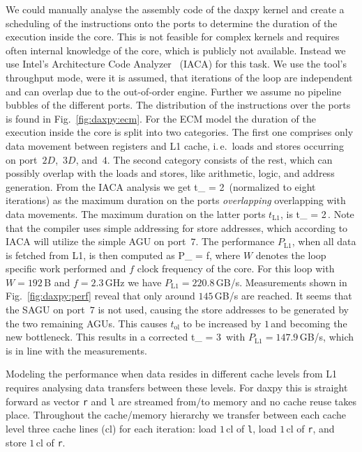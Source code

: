 {We could manually analyse the assembly code of the daxpy kernel and create a
scheduling of the instructions onto the ports to determine the duration of the
execution inside the core.
This is not feasible for complex kernels and requires often internal knowledge
of the core, which is publicly not available.
Instead we use Intel's Architecture Code Analyzer~\cite{intel-iaca} (IACA)
for this task. 
We use the tool's throughput mode, were it is assumed, that iterations of the
loop are independent and can overlap due to the out-of-order engine.
Further we assume no pipeline bubbles of the different ports. 
The distribution of the instructions over the ports is found in
Fig.~\ref{fig:daxpy:ecm}.
For the ECM model the duration of the execution inside the core is split into
two categories.
The first one comprises only data movement between registers and L1 cache,
i.\,e.\ loads and stores occurring on port~$2D$,~$3D$, and~$4$.
The second category consists of the rest, which can possibly overlap with the
loads and stores, like arithmetic, logic, and address generation.
%
From the IACA analysis we get 
\be
  t_ = 2\,\cyw
\ee
%
(normalized to eight iterations) as the maximum duration on the ports \textit{overlapping} overlapping with data
movements.
The maximum duration on the latter ports $t_\text{L1}$, is
\be
  t_ = 2\,\cyw.
\ee
%
Note that the compiler uses simple addressing for store addresses, which
according to IACA will utilize the simple AGU on port~$7$.
%
%
The performance $P_\text{L1}$, when all data is fetched from L1, is then
computed as 
%
\be
  P_ =  f,
\ee
%
where $W$ denotes the loop specific work performed and $f$ clock
frequency of the core.
For this loop with $W=192$\,B and $f=2.3$\,GHz we have $P_\text{L1} =
220.8$\,GB/s. 
Measurements shown in Fig.~\ref{fig:daxpy:perf} reveal that only around
$145$\,GB/s are reached.
It seems that the SAGU on port~$7$ is not used, causing the store addresses to
be generated by the two remaining AGUs.
This causes $t_\text{ol}$ to be increased by $1$\,\cyw and becoming the new
bottleneck.
This results in a corrected
%
\be
   t_ = 3\,\cyw
\ee
%
with $P_\text{L1} = 147.9$\,GB/s, which is in line with the measurements.


Modeling the performance when data resides in different cache levels from L1
requires analysing data transfers between these levels.
For daxpy this is straight forward as vector \verb'r' and \verb'l' are
streamed from/to memory and no cache reuse takes place.
Throughout the cache/memory hierarchy we transfer between each cache level three 
cache lines (cl) for each iteration: load $1$\,cl of \verb'l', load $1$\,cl of
\verb'r', and store $1$\,cl of \verb'r'.

}
